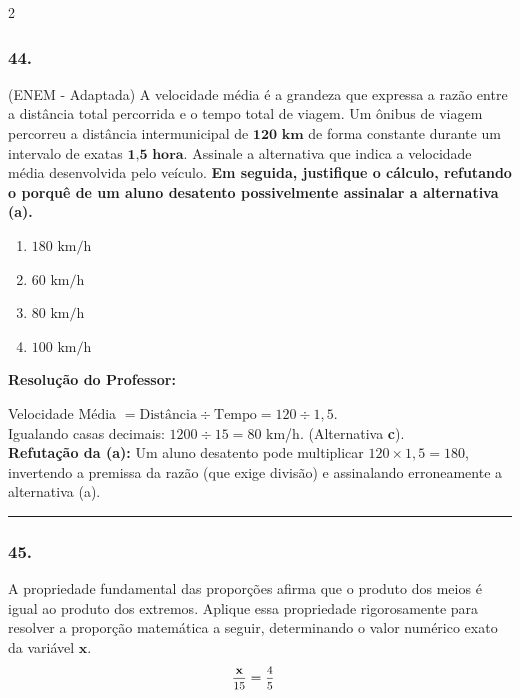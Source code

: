 \begin{multicols*}{2}
\subsubsection*{44.} (ENEM - Adaptada) A velocidade média é a grandeza que expressa a razão entre a distância total percorrida e o tempo total de viagem. Um ônibus de viagem percorreu a distância intermunicipal de $ \textbf{120 km} $ de forma constante durante um intervalo de exatas $ \textbf{1,5 hora} $. Assinale a alternativa que indica a velocidade média desenvolvida pelo veículo. \textbf{Em seguida, justifique o cálculo, refutando o porquê de um aluno desatento possivelmente assinalar a alternativa (a).}
\begin{enumerate}[label=\alph*), itemsep=\espacoAlt]
    \item $ 180 \text{ km/h} $
    \item $ 60 \text{ km/h} $
    \item $ 80 \text{ km/h} $
    \item $ 100 \text{ km/h} $
\end{enumerate}

\ifgabarito
    \begin{tcolorbox}[colback=CorTitUm!5, colframe=CorTitUm, boxrule=1pt, arc=4pt, left=6pt, right=6pt, top=6pt, bottom=6pt]
    \small\textbf{\textcolor{CorTitUm}{Resolução do Professor:}}\par\vspace{0.1cm}
    \color{CinzaEscuro}
    Velocidade Média $= \text{Distância} \div \text{Tempo} = 120 \div 1,5 $.\\
    Igualando casas decimais: $ 1200 \div 15 = 80 $ km/h. (Alternativa \textbf{c}).\\
    \textbf{Refutação da (a):} Um aluno desatento pode multiplicar $ 120 \times 1,5 = 180 $, invertendo a premissa da razão (que exige divisão) e assinalando erroneamente a alternativa (a).
    \end{tcolorbox}
\fi

\par\vspace{\espacoQuestao}

\noindent\textcolor{CorLinha}{\rule{\linewidth}{0.5pt}} 
\par\vspace{\espacoPreQuestao}
\subsubsection*{45.} A propriedade fundamental das proporções afirma que o produto dos meios é igual ao produto dos extremos. Aplique essa propriedade rigorosamente para resolver a proporção matemática a seguir, determinando o valor numérico exato da variável $ \textbf{x} $.
$$
\begin{aligned}
& \mfrac{\textbf{x}}{15} = \mfrac{4}{5}
\end{aligned}
$$


\end{multicols*}
